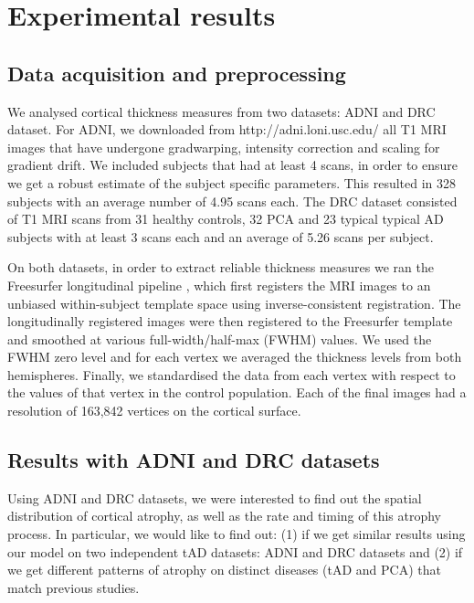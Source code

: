 \section{Experimental results}
\label{sec:vwdpm_results}

\subsection{Data acquisition and preprocessing}

We analysed cortical thickness measures from two datasets: ADNI and DRC dataset. For ADNI, we downloaded from http://adni.loni.usc.edu/ all T1 MRI images that have undergone gradwarping, intensity correction and scaling for gradient drift. We included subjects that had at least 4 scans, in order to ensure we get a robust estimate of the subject specific parameters. This resulted in 328 subjects with an average number of 4.95 scans each. The DRC dataset consisted of T1 MRI scans from 31 healthy controls, 32 PCA and 23 typical typical AD subjects with at least 3 scans each and an average of 5.26 scans per subject.

On both datasets, in order to extract reliable thickness measures we ran the Freesurfer longitudinal pipeline \cite{reuter2012within}, which first registers the MRI images to an unbiased within-subject template space using inverse-consistent registration. The longitudinally registered images were then registered to the Freesurfer template and smoothed at various full-width/half-max (FWHM) values. We used the FWHM zero level and for each vertex we averaged the thickness levels from both hemispheres. Finally, we standardised the data from each vertex with respect to the values of that vertex in the control population.  Each of the final images had a resolution of 163,842 vertices on the cortical surface. 


\subsection{Results with ADNI and DRC datasets}
\label{sec:vwdpm_results_sub}

Using ADNI and DRC datasets, we were interested to find out the spatial distribution of cortical atrophy, as well as the rate and timing of this atrophy process. In particular, we would like to find out: (1) if we get similar results using our model on two independent tAD datasets: ADNI and DRC datasets and (2) if we get different patterns of atrophy on distinct diseases (tAD and PCA) that match previous studies. 

